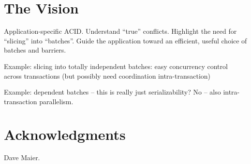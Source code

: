 \documentclass{sig-alternate}
\begin{document}
\section{The Vision}
Application-specific ACID.  Understand ``true'' conflicts.  Highlight the need
for ``slicing'' into ``batches''.  Guide the application toward an efficient,
useful choice of batches and barriers.

Example: slicing into totally independent batches: easy concurrency control
across transactions (but possibly need coordination intra-transaction)

Example: dependent batches -- this is really just serializability?  No -- also
intra-transaction parallelism.


\section{Acknowledgments}
Dave Maier.



\end{document}
